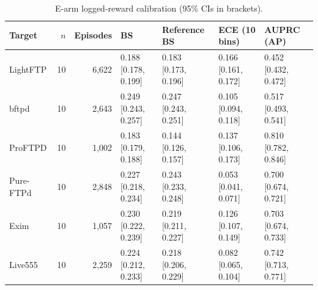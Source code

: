 \begin{table}[t]
\centering\footnotesize
\caption{E-arm logged-reward calibration (95\% CIs in brackets).}
\label{tab:logged_calibration}
\begin{tabularx}{\textwidth}{l r r *{4}{>{\centering\arraybackslash}X}}
\toprule
Target & $n$ & Episodes & BS & Reference BS & ECE (10 bins) & AUPRC (AP) \\
\midrule
LightFTP & 10 & 6,622 & \shortstack{0.188\\{[0.178, 0.199]}} & \shortstack{0.183\\{[0.173, 0.196]}} & \shortstack{0.166\\{[0.161, 0.172]}} & \shortstack{0.452\\{[0.432, 0.472]}} \\
bftpd & 10 & 2,643 & \shortstack{0.249\\{[0.243, 0.257]}} & \shortstack{0.247\\{[0.243, 0.251]}} & \shortstack{0.105\\{[0.094, 0.118]}} & \shortstack{0.517\\{[0.493, 0.541]}} \\
ProFTPD & 10 & 1,002 & \shortstack{0.183\\{[0.179, 0.188]}} & \shortstack{0.144\\{[0.126, 0.157]}} & \shortstack{0.137\\{[0.106, 0.173]}} & \shortstack{0.810\\{[0.782, 0.846]}} \\
Pure-FTPd & 10 & 2,848 & \shortstack{0.227\\{[0.218, 0.234]}} & \shortstack{0.243\\{[0.233, 0.248]}} & \shortstack{0.053\\{[0.041, 0.071]}} & \shortstack{0.700\\{[0.674, 0.721]}} \\
Exim & 10 & 1,057 & \shortstack{0.230\\{[0.222, 0.239]}} & \shortstack{0.219\\{[0.211, 0.227]}} & \shortstack{0.126\\{[0.107, 0.149]}} & \shortstack{0.703\\{[0.674, 0.733]}} \\
Live555 & 10 & 2,259 & \shortstack{0.224\\{[0.212, 0.233]}} & \shortstack{0.218\\{[0.206, 0.229]}} & \shortstack{0.082\\{[0.065, 0.104]}} & \shortstack{0.742\\{[0.713, 0.771]}} \\

\end{tabularx}
\end{table}
